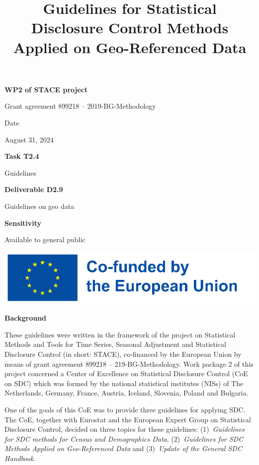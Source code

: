 \documentclass[openany,oneside]{book}
\title{Guidelines for Statistical Disclosure Control Methods Applied on Geo-Referenced Data}
\author{}
\date{}
\begin{document}

\begin{center}

\sffamily
\bfseries
{\Large WP2 of STACE project}\bigskip

{\Large Grant agreement 899218 – 2019-BG-Methodology}\vspace{72pt}

{\Large Date}\bigskip

\mdseries
{\large August 31, 2024}\vspace{36pt}

\bfseries
{\Large Task T2.4}\bigskip

\mdseries
{\large Guidelines}\vspace{36pt}

\bfseries
{\Large Deliverable D2.9}\bigskip

\mdseries
{\large Guidelines on geo data}\vspace{72pt}

\bfseries
{\Large Sensitivity}\bigskip

\mdseries
{\large Available to general public}\vspace{90pt}
\rmfamily

\includegraphics{eu_funded.png}

\end{center}

\newpage

\thispagestyle{empty}
\noindent \textbf{\large Background}\bigskip

\noindent These guidelines were written in the framework of the project on Statistical Methods and Tools for Time Series, Seasonal Adjustment and Statistical Disclosure Control (in short: STACE), co-financed by the European Union by means of grant agreement 899218 -- 219-BG-Methodology. Work package 2 of this project concerned a Center of Excellence on Statistical Disclosure Control (CoE on SDC) which was formed by the national statistical institutes (NISs) of The Netherlands, Germany, France, Austria, Iceland, Slovenia, Poland and Bulgaria.

One of the goals of this CoE was to provide three guidelines for applying SDC. The CoE, together with Eurostat and the European Expert Group on Statistical Disclosure Control, decided on three topics for these guidelines: (1)~\textit{Guidelines for SDC methods for Census and Demographics Data}, (2)~\textit{Guidelines for SDC Methods Applied on Geo-Referenced Data} and (3)~\textit{Update of the General SDC Handbook}.
\end{document}
